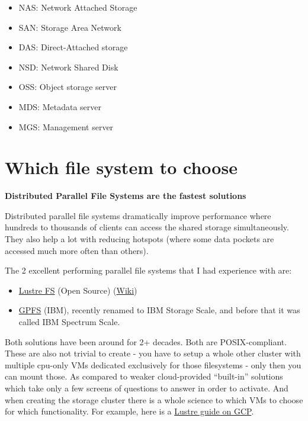 \documentclass[
]{report}
\providecommand{\tightlist}{%
  \setlength{\itemsep}{0pt}\setlength{\parskip}{0pt}}\usepackage{longtable,booktabs,array}
\begin{document}
\begin{itemize}
\tightlist
\item
  NAS: Network Attached Storage
\item
  SAN: Storage Area Network
\item
  DAS: Direct-Attached storage
\item
  NSD: Network Shared Disk
\item
  OSS: Object storage server
\item
  MDS: Metadata server
\item
  MGS: Management server
\end{itemize}

\section{Which file system to choose}\label{which-file-system-to-choose}

\textbf{Distributed Parallel File Systems are the fastest solutions}

Distributed parallel file systems dramatically improve performance where
hundreds to thousands of clients can access the shared storage
simultaneously. They also help a lot with reducing hotspots (where some
data pockets are accessed much more often than others).

The 2 excellent performing parallel file systems that I had experience
with are:

\begin{itemize}
\tightlist
\item
  \href{https://www.lustre.org/}{Lustre FS} (Open Source)
  (\href{https://wiki.lustre.org/Main_Page}{Wiki})
\item
  \href{https://en.wikipedia.org/wiki/GPFS}{GPFS} (IBM), recently
  renamed to IBM Storage Scale, and before that it was called IBM
  Spectrum Scale.
\end{itemize}

Both solutions have been around for 2+ decades. Both are
POSIX-compliant. These are also not trivial to create - you have to
setup a whole other cluster with multiple cpu-only VMs dedicated
exclusively for those filesystems - only then you can mount those. As
compared to weaker cloud-provided ``built-in'' solutions which take only
a few screens of questions to answer in order to activate. And when
creating the storage cluster there is a whole science to which VMs to
choose for which functionality. For example, here is a
\href{https://cloud.google.com/architecture/lustre-architecture}{Lustre
guide on GCP}.
\end{document}
